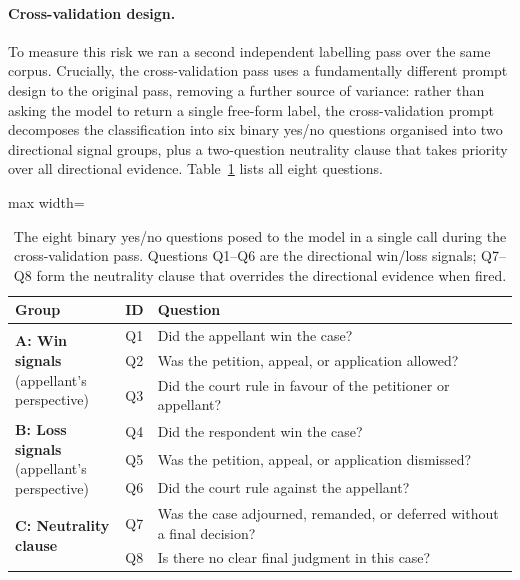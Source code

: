 \paragraph{Cross-validation design.}
To measure this risk we ran a second independent labelling pass over the same
corpus. Crucially, the cross-validation pass uses a fundamentally different prompt
design to the original pass, removing a further source of variance: rather than
asking the model to return a single free-form label, the cross-validation prompt
decomposes the classification into six binary yes/no questions organised into two
directional signal groups, plus a two-question neutrality clause that takes
priority over all directional evidence. Table~\ref{tab:crossval_questions}
lists all eight questions.

\begin{table}[H]
  \centering
  \small
  \begin{adjustbox}{max width=\textwidth}
  \begin{tabular}{llp{9.5cm}}
    \toprule
    Group & ID & Question \\
    \midrule
    \multirow{3}{*}{\parbox{2.5cm}{\textbf{A: Win signals}\\(appellant's\\perspective)}}
      & Q1 & Did the appellant win the case? \\
      & Q2 & Was the petition, appeal, or application allowed? \\
      & Q3 & Did the court rule in favour of the petitioner or appellant? \\[6pt]
    \multirow{3}{*}{\parbox{2.5cm}{\textbf{B: Loss signals}\\(appellant's\\perspective)}}
      & Q4 & Did the respondent win the case? \\
      & Q5 & Was the petition, appeal, or application dismissed? \\
      & Q6 & Did the court rule against the appellant? \\[6pt]
    \multirow{2}{*}{\parbox{2.5cm}{\textbf{C: Neutrality\\clause}}}
      & Q7 & Was the case adjourned, remanded, or deferred without a final decision? \\
      & Q8 & Is there no clear final judgment in this case? \\
    \bottomrule
  \end{tabular}
  \end{adjustbox}
  \caption{The eight binary yes/no questions posed to the model in a single call
  during the cross-validation pass. Questions Q1--Q6 are the directional win/loss
  signals; Q7--Q8 form the neutrality clause that overrides the directional
  evidence when fired.}
  \label{tab:crossval_questions}
\end{table}

